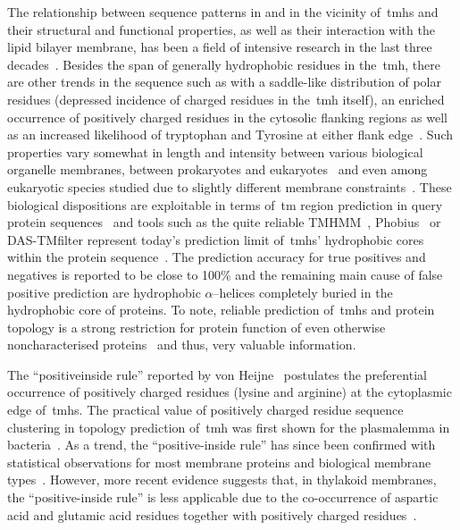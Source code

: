 The relationship between sequence patterns in and in the vicinity of~\gls{tmh}s and their structural and functional properties, as well as their interaction with the lipid bilayer membrane, has been a field of intensive research in the last three decades~\cite{Ladokhin2015}.
Besides the span of generally hydrophobic residues in the~\gls{tmh}, there are other trends in the sequence such as with a saddle-like distribution of polar residues (depressed incidence of charged residues in the~\gls{tmh}  itself), an enriched occurrence of positively charged residues in the cytosolic flanking regions as well as an increased likelihood of tryptophan and Tyrosine at either flank edge~\cite{Sharpe2010, VonHeijne1986,VonHeijne1988,VonHeijne1989, Baeza-Delgado2013, Granseth2005}.
Such properties vary somewhat in length and intensity between various biological organelle membranes, between prokaryotes and eukaryotes~\cite{Ojemalm2013} and even among eukaryotic species studied due to slightly different membrane constraints~\cite{Sharpe2010, Pogozheva2013}.
These biological dispositions are exploitable in terms of~\gls{tm} region prediction in query protein sequences~\cite{Beuming2004, Zhao2006} and tools such as the quite reliable TMHMM~\cite{Krogh2001,Sonnhammer1998}, Phobius~\cite{Kall2004, Kall2007} or DAS-TMfilter represent today’s prediction limit of~\gls{tmh}s’ hydrophobic cores within the protein sequence~\cite{Cserzo2002, Cserzo2004, Kall2002}.
The prediction accuracy for true positives and negatives is reported to be close to 100\% and the remaining main cause of false positive prediction are hydrophobic \(\alpha\)--helices completely buried in the hydrophobic core of proteins.
 To note, reliable prediction of~\gls{tmh}s and protein topology is a strong restriction for protein function of even otherwise non\-characterised proteins~\cite{Eisenhaber2016, Eisenhaber2012, Sherman2015} and thus, very valuable information.

The ``positive\-inside rule'' reported by von Heijne~\cite{VonHeijne2006,VonHeijne1989} postulates the preferential occurrence of positively charged residues (lysine and arginine) at the cytoplasmic edge of~\gls{tmh}s.
The practical value of positively charged residue sequence clustering in topology prediction of~\gls{tmh} was first shown for the plasmalemma in bacteria~\cite{VonHeijne1989, Sipos1993}.
As a trend, the ``positive-inside rule'' has since been confirmed with statistical observations for most membrane proteins and biological membrane types~\cite{Baeza-Delgado2013, Gavel1991, Nilsson2005a, Wallin1998}.
However, more recent evidence suggests that, in thylakoid membranes, the ``positive-inside rule'' is less applicable due to the co-occurrence of aspartic acid and glutamic acid residues together with positively charged residues~\cite{Pogozheva2013}.


